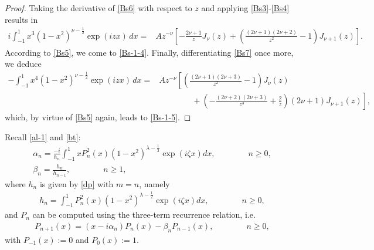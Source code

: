 \documentclass[11pt,a4paper]{article}
\numberwithin{equation}{section}
\begin{document}
{\begin{appendices}
\begin{proof}
Taking the derivative of \eqref{Bs6} with respect to $z$ and applying \eqref{Bs3}-\eqref{Bs4} results in
\begin{align}
i\int_{-1}^{1}x^3(1-x^2)^{\nu-\frac{1}{2}}\exp(\mathit{i}z x)\, dx
=& Az^{-\nu}\left[-\frac{2\nu+1}{z}J_{\nu}(z)+\left(\frac{(2\nu+1)(2\nu+2)}{z^2}-1\right)J_{\nu+1}(z)\right].\label{Bs7}
\end{align}
According to \eqref{Bs5}, we come to \eqref{Bs-1-4}. Finally, differentiating \eqref{Bs7} once more, we deduce
\begin{align*}
-\int_{-1}^{1}x^4(1-x^2)^{\nu-\frac{1}{2}}\exp(\mathit{i}z x)\, dx
=& Az^{-\nu}\left[\left(\frac{(2\nu+1)(2\nu+3)}{z^2}-1\right)J_{\nu}(z)\right.\\
&\left.\qquad\qquad+\left(-\frac{(2\nu+2)(2\nu+3)}{z^3}+\frac{2}{z}\right)(2\nu+1)J_{\nu+1}(z)\right],
\end{align*}
which, by virtue of \eqref{Bs5} again, leads to \eqref{Bs-1-5}.
\end{proof}

Recall \eqref{al-1} and \eqref{bt}:
\begin{gather}
\alpha_n=\frac{-i}{h_n}\int_{-1}^1xP_n^2(x)(1-x^2)^{\lambda-\frac{1}{2}}\exp(\mathit{i}\zeta x)dx, \qquad\qquad n\geq0,\label{al-int}\\
\beta_n=\frac{h_n}{h_{n-1}}, \qquad\qquad n\geq1,\label{bt-h}
\end{gather}
where $h_n$ is given by \eqref{dp} with $m=n$, namely
\begin{gather}\label{h-int}
h_n=\int_{-1}^1P_n^2(x)(1-x^2)^{\lambda-\frac{1}{2}}\exp(\mathit{i}\zeta x)dx,\qquad\qquad n\geq0,
\end{gather}
and $P_n$ can be computed using the three-term recurrence relation, i.e.
\begin{gather}
P_{n+1}(x)=(x-i\alpha_{n})P_{n}(x)-\beta_{n}P_{n-1}(x),\qquad\qquad n\geq0,\label{P-3r}
\end{gather}
with $P_{-1}(x):=0$ and $P_0(x):=1$.


\end{appendices}}
\end{document}
